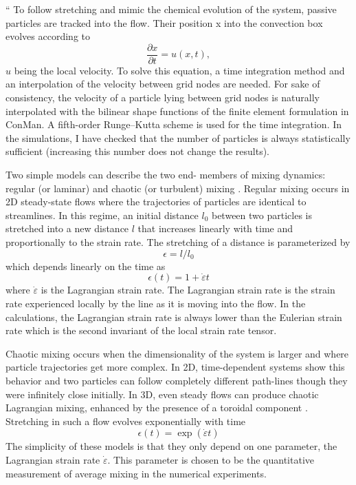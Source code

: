 \begin{displayquote}
{\color{darkgray}
``
To follow stretching and mimic the chemical
evolution of the system, passive particles are tracked
into the flow. Their position x into the convection box
evolves according to
\[
\frac{\partial x}{\partial t} = u(x,t),
\]
$u$ being the local velocity. To solve this equation, a
time integration method and an interpolation of the
velocity between grid nodes are needed. For sake of
consistency, the velocity of a particle lying between
grid nodes is naturally interpolated with the bilinear
shape functions of the finite element formulation in
ConMan. A fifth-order Runge–Kutta scheme is
used for the time integration. In the simulations, I
have checked that the number of particles is always
statistically sufficient (increasing this number does
not change the results).

Two simple models can describe the two end-
members of mixing dynamics: regular (or laminar)
and chaotic (or turbulent) mixing \cite{olyb84b}. Regular
mixing occurs in 2D steady-state flows where the
trajectories of particles are identical to streamlines. In
this regime, an initial distance $l_0$ between two
particles is stretched into a new distance $l$ that
increases linearly with time and proportionally to the
strain rate. The stretching of a distance is parameterized by
\[
\epsilon= l/l_0
\]
which depends linearly on the time as
\begin{equation}\label{eq:mixx:05}
\epsilon(t) = 1+\dot \varepsilon t
\end{equation}
where $\dot{\varepsilon}$ is the Lagrangian strain rate. 
The Lagrangian strain rate is the strain rate experienced locally
by the line as it is moving into the flow. In the
calculations, the Lagrangian strain rate is always
lower than the Eulerian strain rate which is the
second invariant of the local strain rate tensor.

Chaotic mixing occurs when the dimensionality of
the system is larger and where particle trajectories get
more complex. In 2D, time-dependent systems show
this behavior and two particles can follow completely
different path-lines though they were infinitely close
initially. In 3D, even steady flows can produce chaotic
Lagrangian mixing, enhanced by the presence of a
toroidal component \cite{feri98}. Stretching in such a flow
evolves exponentially with time
\[
\epsilon (t) = \exp (\dot \varepsilon t)
\]
The simplicity of these models is that they only
depend on one parameter, the Lagrangian strain rate $\dot\varepsilon$.
This parameter is chosen to be the quantitative
measurement of average mixing in the numerical
experiments. 


}
\end{displayquote}
